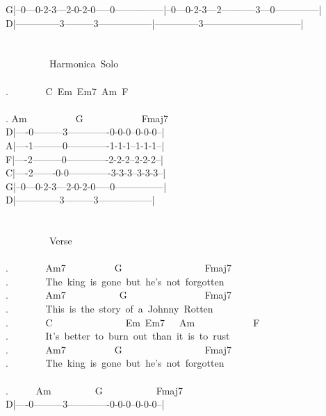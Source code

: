{G|--0---0-2-3---2-0-2-0-----0---------------|--0---0-2-3---2-----------3---0--------------|\\
D|--------------3---------3-----------------|--------------3------------------------------|\\
\\
\\
\ \ \ \ \ \ \ \ \lbrack\ Harmonica\ Solo\rbrack\\
\\
. \ \ \ \ \ \ \ C\ Em\ Em7\ Am\ F\\
\\
. Am\ \ \ \ \ \ \ \ \ \ G\ \ \ \ \ \ \ \ \ \ \ \ Fmaj7\ \ \ \ \ \ \ \ \ \ \ \ \ \\
D|----0---------3-------------0-0-0--0-0-0--|\\
A|----1---------0-------------1-1-1--1-1-1--|\\
F|----2---------0-------------2-2-2--2-2-2--|\\
C|----2-------0-0-------------3-3-3--3-3-3--|\\
G|--0---0-2-3---2-0-2-0-----0---------------|\\
D|--------------3---------3-----------------|\\
\\
\\
\ \ \ \ \ \ \ \ \lbrack\ Verse\rbrack\\
\\
. \ \ \ \ \ \ \ Am7\ \ \ \ \ \ \ \ \ \ G\ \ \ \ \ \ \ \ \ \ \ \ \ \ \ \ \ Fmaj7\\
. \ \ \ \ \ \ \ The\ king\ is\ gone\ but\ he's\ not\ forgotten\\
. \ \ \ \ \ \ \ Am7\ \ \ \ \ \ \ \ \ \ \ G\ \ \ \ \ \ \ \ \ \ \ \ \ \ \ \ Fmaj7\\
. \ \ \ \ \ \ \ This\ is\ the\ story\ of\ a\ Johnny\ Rotten\\
. \ \ \ \ \ \ \ C\ \ \ \ \ \ \ \ \ \ \ \ \ \ \ Em\ Em7\ \ \ Am\ \ \ \ \ \ \ \ \ \ \ \ F\\
. \ \ \ \ \ \ \ It's\ better\ to\ burn\ out\ than\ it\ is\ to\ rust\\
. \ \ \ \ \ \ \ Am7\ \ \ \ \ \ \ \ \ \ G\ \ \ \ \ \ \ \ \ \ \ \ \ \ \ \ \ Fmaj7\\
. \ \ \ \ \ \ \ The\ king\ is\ gone\ but\ he's\ not\ forgotten\\
\\
. \ \ \ \ \ Am\ \ \ \ \ \ \ \ \ G\ \ \ \ \ \ \ \ \ \ \ Fmaj7\ \ \ \ \ \ \ \ \ \ \ \ \ \ \\
D|----0---------3-------------0-0-0--0-0-0--|\\
}
